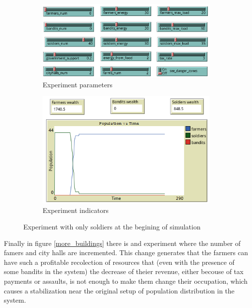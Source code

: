 \documentclass{wscpaperproc}
\begin{document}
\begin{figure}[h!]
    \begin{subfigure}{0.45\textwidth}
    \includegraphics[width=\textwidth]{Images/Exp4_sliders.png}
    \caption{Experiment parameters}
    \end{subfigure}
    \hfill
    \begin{subfigure}{0.45\textwidth}
    \includegraphics[width=\textwidth]{Images/Exp4_indicators.png}
    \caption{Experiment indicators}
    \end{subfigure}%
    \caption{Experiment with only soldiers at the begining of simulation}
    \label{soldiers_only}
\end{figure}

\newpage

Finally in figure \ref{more_buildings} there is and experiment where the number
of famers and city halls are incremented. This change generates that the farmers
can have such a profitable recolection of resources that (even with the presence
of some bandits in the system) the decrease of theier revenue, either becouse of
tax payments or assaults, is not enough to make them change their occupation,
which causes a stabilization near the original setup of population distribution
in the system.
\end{document}
